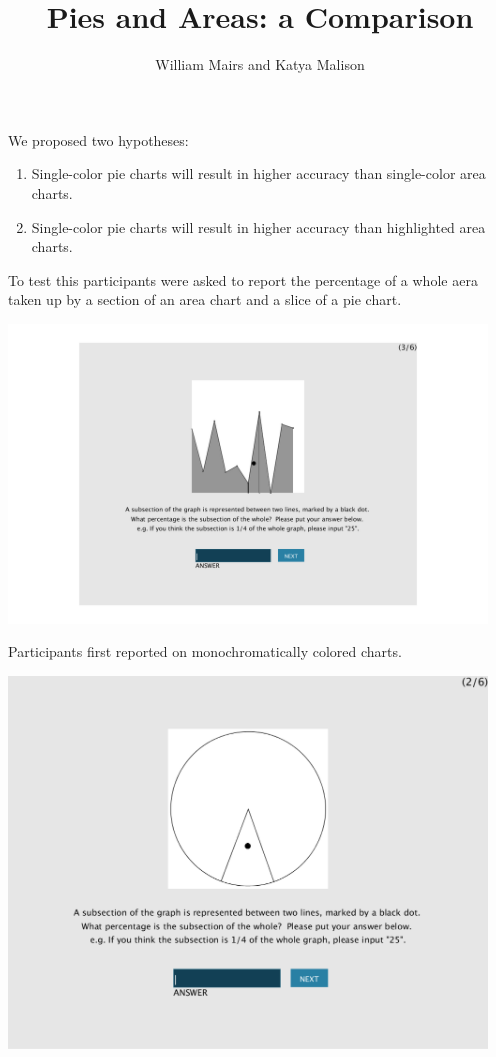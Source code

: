 \documentclass[12pt]{article}
\author{William Mairs and Katya Malison}
\title{Pies and Areas: a Comparison}
\begin{document}
  
\maketitle

\pagestyle{empty}      %
We proposed two hypotheses:
\begin{enumerate}[-]
\item Single-color pie charts will result in higher accuracy than single-color area charts.
\item Single-color pie charts will result in higher accuracy than highlighted area charts.
\end{enumerate}
To test this participants were asked to report the percentage of a whole aera taken up by a section of an area chart and a slice of a pie chart. 
\begin{center}
\includegraphics[width=5in]{monochrome_area.png}
\end{center}
Participants first reported on monochromatically colored charts.
\begin{center}
\includegraphics[width=5in]{monochrome_pie.png}
\end{center}
\end{document}

